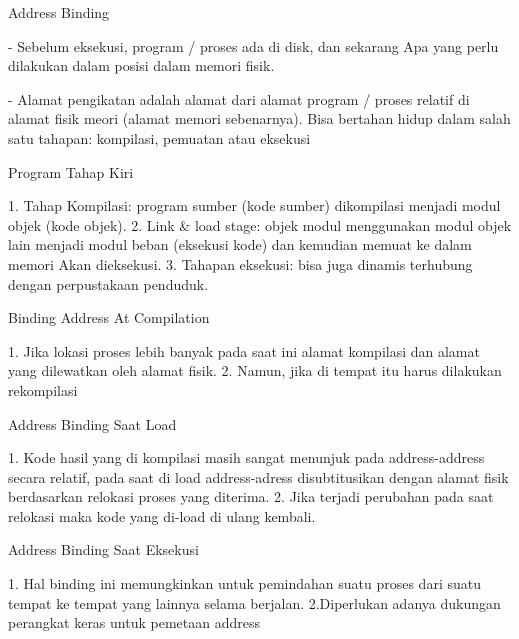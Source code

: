 Address Binding

- Sebelum eksekusi, program / proses ada di disk, dan sekarang
Apa yang perlu dilakukan dalam posisi dalam memori fisik.

- Alamat pengikatan adalah alamat dari alamat program / proses relatif
di alamat fisik meori (alamat memori sebenarnya). Bisa bertahan hidup
dalam salah satu tahapan: kompilasi, pemuatan atau eksekusi

Program Tahap Kiri

1. Tahap Kompilasi: program sumber (kode sumber) dikompilasi menjadi
modul objek (kode objek).
2. Link & load stage: objek modul menggunakan modul objek lain
menjadi modul beban (eksekusi kode) dan kemudian memuat ke dalam memori
Akan dieksekusi.
3. Tahapan eksekusi: bisa juga dinamis
terhubung dengan perpustakaan penduduk.

Binding Address At Compilation

1. Jika lokasi proses lebih banyak pada saat ini
alamat kompilasi dan alamat yang dilewatkan oleh alamat
fisik.
2. Namun, jika di tempat itu harus dilakukan rekompilasi

Address Binding Saat Load

1. Kode hasil yang di kompilasi masih sangat menunjuk pada address-address secara relatif, pada saat di load address-adress disubtitusikan dengan alamat fisik berdasarkan relokasi proses yang diterima.
2. Jika terjadi perubahan pada saat relokasi maka kode yang di-load di ulang kembali.

Address Binding Saat Eksekusi

1. Hal binding ini memungkinkan untuk pemindahan suatu proses dari suatu tempat ke tempat yang lainnya selama berjalan.
2.Diperlukan adanya dukungan perangkat keras untuk pemetaan address



